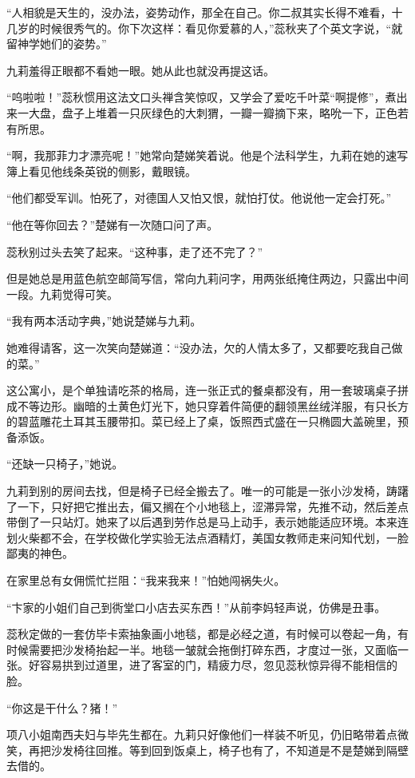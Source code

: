 \par “人相貌是天生的，没办法，姿势动作，那全在自己。你二叔其实长得不难看，十几岁的时候很秀气的。你下次这样：看见你爱慕的人，”蕊秋夹了个英文字说，“就留神学她们的姿势。”
\par 九莉羞得正眼都不看她一眼。她从此也就没再提这话。
\par “呜啦啦！”蕊秋惯用这法文口头禅含笑惊叹，又学会了爱吃千叶菜“啊提修”，煮出来一大盘，盘子上堆着一只灰绿色的大刺猬，一瓣一瓣摘下来，略吮一下，正色若有所思。
\par “啊，我那菲力才漂亮呢！”她常向楚娣笑着说。他是个法科学生，九莉在她的速写簿上看见他线条英锐的侧影，戴眼镜。
\par “他们都受军训。怕死了，对德国人又怕又恨，就怕打仗。他说他一定会打死。”
\par “他在等你回去？”楚娣有一次随口问了声。
\par 蕊秋别过头去笑了起来。“这种事，走了还不完了？”
\par 但是她总是用蓝色航空邮简写信，常向九莉问字，用两张纸掩住两边，只露出中间一段。九莉觉得可笑。
\par “我有两本活动字典，”她说楚娣与九莉。
\par 她难得请客，这一次笑向楚娣道：“没办法，欠的人情太多了，又都要吃我自己做的菜。”
\par 这公寓小，是个单独请吃茶的格局，连一张正式的餐桌都没有，用一套玻璃桌子拼成不等边形。幽暗的土黄色灯光下，她只穿着件简便的翻领黑丝绒洋服，有只长方的碧蓝雕花土耳其玉腰带扣。菜已经上了桌，饭照西式盛在一只椭圆大盖碗里，预备添饭。
\par “还缺一只椅子，”她说。
\par 九莉到别的房间去找，但是椅子已经全搬去了。唯一的可能是一张小沙发椅，踌躇了一下，只好把它推出去，偏又搁在个小地毯上，涩滞异常，先推不动，然后差点带倒了一只站灯。她来了以后遇到劳作总是马上动手，表示她能适应环境。本来连划火柴都不会，在学校做化学实验无法点酒精灯，美国女教师走来问知代划，一脸鄙夷的神色。
\par 在家里总有女佣慌忙拦阻：“我来我来！”怕她闯祸失火。
\par “卞家的小姐们自己到衖堂口小店去买东西！”从前李妈轻声说，仿佛是丑事。
\par 蕊秋定做的一套仿毕卡索抽象画小地毯，都是必经之道，有时候可以卷起一角，有时候需要把沙发椅抬起一半。地毯一皱就会拖倒打碎东西，才度过一张，又面临一张。好容易拱到过道里，进了客室的门，精疲力尽，忽见蕊秋惊异得不能相信的脸。
\par “你这是干什么？猪！”
\par 项八小姐南西夫妇与毕先生都在。九莉只好像他们一样装不听见，仍旧略带着点微笑，再把沙发椅往回推。等到回到饭桌上，椅子也有了，不知道是不是楚娣到隔壁去借的。
